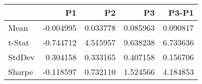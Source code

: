 \begin{tabular}{lrrrr}
\toprule
 & P1 & P2 & P3 & P3-P1 \\
\midrule
Mean & -0.004995 & 0.033778 & 0.085963 & 0.090817 \\
t-Stat & -0.744712 & 4.515957 & 9.638238 & 6.733636 \\
StdDev & 0.304158 & 0.333165 & 0.407158 & 0.156706 \\
Sharpe & -0.118597 & 0.732110 & 1.524566 & 4.184853 \\
\bottomrule
\end{tabular}

